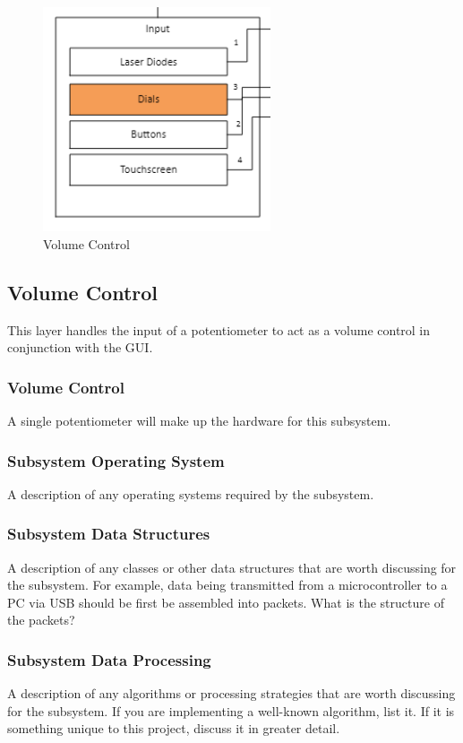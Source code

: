\begin{figure}[h!]
	\centering
 	\includegraphics[width=0.60\textwidth]{images/Dials.png}
 \caption{Volume Control}
\end{figure}
\subsection{Volume Control}
This layer handles the input of a potentiometer to act as a volume control in conjunction with the GUI.


\subsubsection{Volume Control}
A single potentiometer will make up the hardware for this subsystem.

\subsubsection{Subsystem Operating System}
A description of any operating systems required by the subsystem.

\subsubsection{Subsystem Data Structures}
A description of any classes or other data structures that are worth discussing for the subsystem. For example, data being transmitted from a microcontroller to a PC via USB should be first be assembled into packets. What is the structure of the packets?

\subsubsection{Subsystem Data Processing}
A description of any algorithms or processing strategies that are worth discussing for the subsystem. If you are implementing a well-known algorithm, list it. If it is something unique to this project, discuss it in greater detail.

